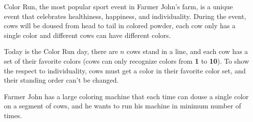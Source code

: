 Color Run, the most popular sport event in Farmer John's farm,
is a unique event that celebrates healthiness, happiness, and individuality.
During the event, cows will be doused from head to tail in colored powder,
each cow only has a single color and different cows can have different colors.

Today is the Color Run day, there are $n$ cows stand in a line,
and each cow has a set of their favorite colors (cows can only recognize colors from \textbf{1} to \textbf{10}).
To show the respect to individuality, cows must get a color in their favorite color set,
and their standing order can't be changed.

Farmer John has a large coloring machine that each time can douse a single color on a segment of cows,
and he wants to run his machine in minimum number of times.
